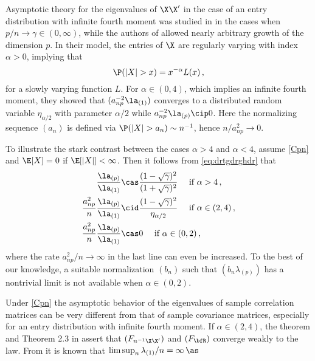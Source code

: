 Asymptotic theory for the eigenvalues of $\X\X'$ in the case of an entry distribution with infinite fourth moment was studied in \cite{soshnikov:2004,soshnikov:2006,auffinger:arous:peche:2009} in the cases when $p/n\to \gamma \in (0,\infty)$, while the authors of \cite{davis:mikosch:heiny:xie:2015,heiny:mikosch:2016} allowed nearly arbitrary growth of the dimension $p$. 
In their model, the entries of $\X$ are regularly varying with index $\alpha>0$, implying that
\begin{equation}\label{eq:reg}
\P(|X|>x) = x^{-\alpha} L(x)\,,
\end{equation}
for a slowly varying function $L$. For $\alpha \in (0,4)$,  which implies an infinite fourth moment, they showed that $(a_{np}^{-2} \la_{(1)})$ converges to a \Frechet distributed random variable $\eta_{\alpha/2}$ with parameter $\alpha/2$ while $a_{np}^{-2} \la_{(p)}\cip 0$. Here the normalizing sequence $(a_n)$  is defined via $\P(|X|>a_n)\sim n^{-1}$, hence $n/a_{np}^{2}\to 0$. 

To illustrate the stark contrast between the cases $\alpha>4$ and $\alpha<4$, assume \eqref{Cpn} and $\E[X]=0$ if $\E[|X|]<\infty$. Then it follows from \eqref{eq:drtgdrghdr} that
\begin{equation}\label{eq:forch1}
\begin{split}
\frac{\la_{(p)}}{\la_{(1)}} &\cas \frac{(1-\sqrt{\gamma})^2}{(1+\sqrt{\gamma})^2} \quad \text{ if } \alpha >4\,,\\
\frac{a_{np}^2}{n} \frac{\la_{(p)}}{\la_{(1)}} &\cid \frac{(1-\sqrt{\gamma})^2}{\eta_{\alpha/2}} \quad \text{ if } \alpha \in (2,4)\,,\\
\frac{a_{np}^2}{n} \frac{\la_{(p)}}{\la_{(1)}} &\cas 0 \quad \text{ if } \alpha \in (0,2)\,,
\end{split}
\end{equation}
where the rate $a_{np}^2/n\to \infty$ in the last line can even be increased. 
To the best of our knowledge, a suitable normalization $(b_n)$ such that $(b_n \lambda_{(p)})$ has a nontrivial limit is not available when $ \alpha \in (0,2)$. 

Under \eqref{Cpn} the asymptotic behavior of the eigenvalues of sample correlation matrices can be very different from that of sample covariance matrices, especially for an entry distribution with infinite fourth moment. If $\alpha\in (2,4)$, the \MP theorem and Theorem 2.3 in \cite{bai:zhou:2008} assert that $(F_{n^{-1}\X\X'})$ and $(F_{\bfR})$  converge weakly to the \MP law. From \cite{baisilv} it is known that $\limsup_n \lambda_{(1)}/n =\infty \,\as$ 
\par

